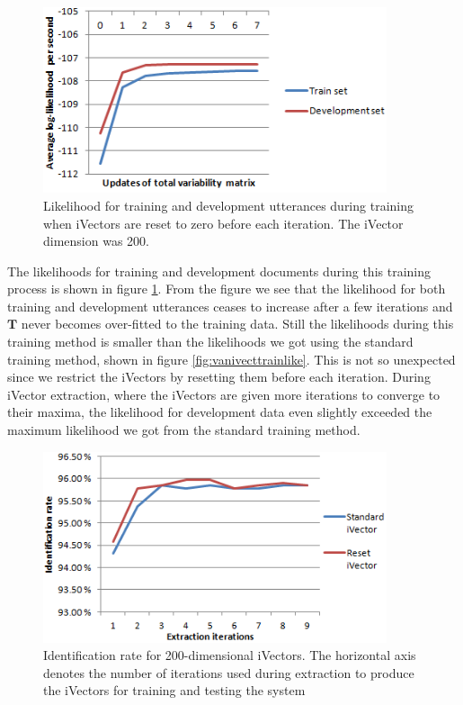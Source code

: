 \begin{figure}[hbt!]
	\begin{center}
	\includegraphics[width=0.9\textwidth]{figures/resetlike.png}
	\caption{Likelihood for training and development utterances during training when iVectors are reset to zero before each iteration. The iVector dimension was 200.}
	\label{fig:resetlike}
	\end{center}
\end{figure}

The likelihoods for training and development documents during this training process is shown in figure \ref{fig:resetlike}. From the figure we see that the likelihood for both training and development utterances ceases to increase after a few iterations and $\mathbf{T}$ never becomes over-fitted to the training data. Still the likelihoods during this training method is smaller than the likelihoods we got using the standard training method, shown in figure \ref{fig:vanivecttrainlike}. This is not so unexpected since we restrict the iVectors by resetting them before each iteration. During iVector extraction, where the iVectors are given more iterations to converge to their maxima, the likelihood for development data even slightly exceeded the maximum likelihood we got from the standard training method.

\begin{figure}[hbt!]
	\begin{center}
	\includegraphics[width=0.9\textwidth]{figures/resetidentification.png}
	\caption{Identification rate for 200-dimensional iVectors. The horizontal axis denotes the number of iterations used during extraction to produce the iVectors for training and testing the system}
	\label{fig:resetidrate}
	\end{center}
\end{figure}


